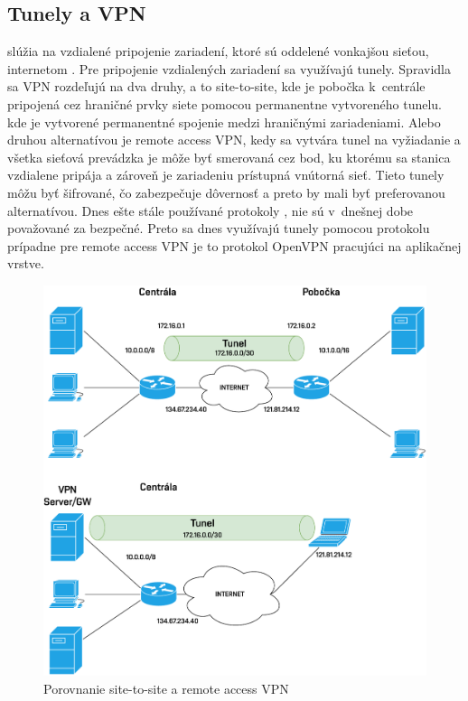 \subsection*{Tunely a VPN}
 slúžia na vzdialené pripojenie zariadení, ktoré sú oddelené vonkajšou sieťou, internetom \cite{Lammle2013}. Pre pripojenie vzdialených zariadení sa využívajú tunely. Spravidla sa VPN rozdeľujú na dva druhy, a to site-to-site, kde je pobočka k~centrále pripojená cez hraničné prvky siete pomocou permanentne vytvoreného tunelu.  kde je vytvorené permanentné spojenie medzi hraničnými zariadeniami. Alebo druhou alternatívou je remote access VPN, kedy sa vytvára tunel na vyžiadanie a všetka sieťová prevádzka je môže byť smerovaná cez bod, ku ktorému sa stanica vzdialene pripája a zároveň je zariadeniu prístupná vnútorná sieť. Tieto tunely môžu byť šifrované, čo zabezpečuje dôvernosť a preto by mali byť preferovanou alternatívou. Dnes ešte stále používané protokoly ,  nie sú v~dnešnej dobe považované za bezpečné. Preto sa dnes využívajú tunely pomocou protokolu  prípadne pre remote access VPN je to protokol OpenVPN pracujúci na aplikačnej vrstve.

\begin{figure}[H]
	\begin{center}
		\includegraphics[scale=0.6]{obrazky/tunnels.pdf}
	\end{center}
	\caption[Porovnanie site-to-site a remote access VPN]{Porovnanie site-to-site a remote access VPN}
	\label{fig:tunnel}
\end{figure} 


